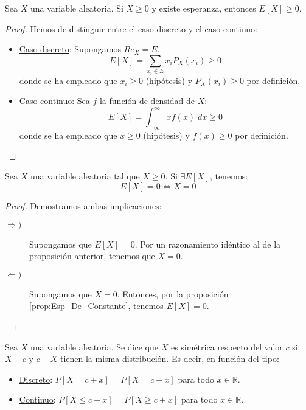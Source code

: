 \begin{prop}\label{prop:6.4}
    Sea $X$ una variable aleatoria. Si $X\geq 0$ y existe esperanza, entonces $E[X]\geq 0$.
\end{prop}
\begin{proof}
    Hemos de distinguir entre el caso discreto y el caso continuo:
    \begin{itemize}
        \item \underline{Caso discreto}: Supongamos $Re_X = E$.
        \begin{equation*}
            E[X] = \sum_{x_i\in E} x_iP_X(x_i) \geq 0
        \end{equation*}
        donde se ha empleado que $x_i\geq 0$ (hipótesis) y $P_X(x_i)\geq0$ por definición.

        \item \underline{Caso continuo}: Sea $f$ la función de densidad de $X$:
        \begin{equation*}
            E[X] = \int_{-\infty}^{\infty} xf(x)\;dx \geq 0
        \end{equation*}
        donde se ha empleado que $x\geq 0$ (hipótesis) y $f(x)\geq0$ por definición.
    \end{itemize}
\end{proof}

\begin{coro}
    Sea $X$ una variable aleatoria tal que $X\geq 0$. Si $\exists E[X]$, tenemos:
    \begin{equation*}
        E[X]=0\Longleftrightarrow X=0
    \end{equation*}
\end{coro}
\begin{proof}
    Demostramos ambas implicaciones:
    \begin{description}
        \item[$\Longrightarrow)$] Supongamos que $E[X]=0$. Por un razonamiento idéntico al de la proposición anterior, tenemos que $X=0$.
        
        \item[$\Longleftarrow)$] Supongamos que $X=0$. Entonces, por la proposición \ref{prop:Esp_De_Constante}, tenemos $E[X]=0$.
    \end{description}
\end{proof}

\begin{definicion}[Simetría]
    Sea $X$ una variable aleatoria. Se dice que $X$ es simétrica respecto del valor $c$ si $X-c$ y $c-X$ tienen la misma distribución.
    Es decir, en función del tipo:
    \begin{itemize}
        \item \underline{Discreto}: $P[X=c+x]=P[X=c-x]$ para todo $x\in \mathbb{R}$.
        \item \underline{Continuo}: $P[X\leq c-x]=P[X\geq c+x]$ para todo $x\in \mathbb{R}$.
    \end{itemize}
\end{definicion}

